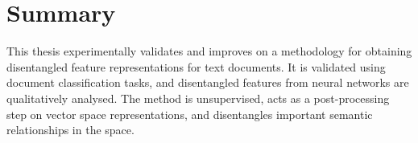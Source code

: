 \section{Summary}

This thesis experimentally validates and improves on a methodology for obtaining disentangled feature representations for text documents. It is validated using document classification tasks, and disentangled features from neural networks are  qualitatively  analysed. The method is unsupervised, acts as a post-processing step on vector space representations, and  disentangles important semantic relationships in the space.  













